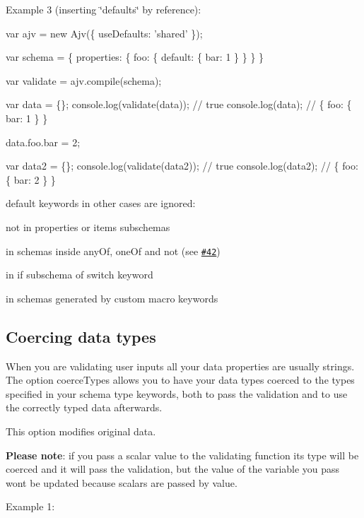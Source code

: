 Example 3 (inserting \char`\"{}defaults\char`\"{} by reference)\+:


\begin{DoxyCode}
var ajv = new Ajv(\{ useDefaults: 'shared' \});

var schema = \{
  properties: \{
    foo: \{
      default: \{ bar: 1 \}
    \}
  \}
\}

var validate = ajv.compile(schema);

var data = \{\};
console.log(validate(data)); // true
console.log(data); // \{ foo: \{ bar: 1 \} \}

data.foo.bar = 2;

var data2 = \{\};
console.log(validate(data2)); // true
console.log(data2); // \{ foo: \{ bar: 2 \} \}
\end{DoxyCode}


{\ttfamily default} keywords in other cases are ignored\+:


\begin{DoxyItemize}
\item not in {\ttfamily properties} or {\ttfamily items} subschemas
\item in schemas inside {\ttfamily any\+Of}, {\ttfamily one\+Of} and {\ttfamily not} (see \href{https://github.com/epoberezkin/ajv/issues/42}{\tt \#42})
\item in {\ttfamily if} subschema of {\ttfamily switch} keyword
\item in schemas generated by custom macro keywords
\end{DoxyItemize}

\subsection*{Coercing data types}

When you are validating user inputs all your data properties are usually strings. The option {\ttfamily coerce\+Types} allows you to have your data types coerced to the types specified in your schema {\ttfamily type} keywords, both to pass the validation and to use the correctly typed data afterwards.

This option modifies original data.

{\bfseries Please note}\+: if you pass a scalar value to the validating function its type will be coerced and it will pass the validation, but the value of the variable you pass won\textquotesingle{}t be updated because scalars are passed by value.

Example 1\+:


